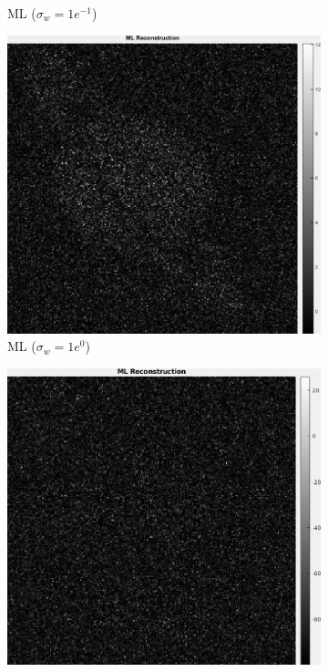 \documentclass[a4paper, 11pt]{article}
\begin{document}
\begin{figure}[h]
\begin{subfigure}[b]{0.22\textwidth}
        \caption{\tiny ML ($\sigma_w=1e^{-1}$)}
        \label{fig:ML-1}
    \end{subfigure}
    \begin{subfigure}[b]{0.22\textwidth}
        \includegraphics[width=\textwidth]{../Figures/MLReconstructionNoiseSigma1e0.png}
        \caption{\tiny ML ($\sigma_w=1e^{0}$)}
        \label{fig:ML0}
    \end{subfigure}
    \begin{subfigure}[b]{0.22\textwidth}
        \includegraphics[width=\textwidth]{../Figures/MLReconstructionNoiseSigma1e1.png}

\end{subfigure}
\end{figure}
\end{document}
